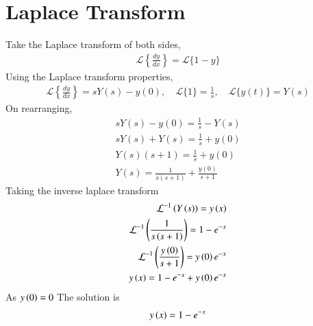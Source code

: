\documentclass[journal,12pt,onecolumn]{IEEEtran}
\theoremstyle{remark}
\begin{document}
\section{Laplace Transform}
Take the Laplace transform of both sides,\\
\begin{align}
    \mathcal{L}\left\{\frac{dy}{dx}\right\} = \mathcal{L}\{1 - y\}
\end{align}
Using the Laplace transform properties,\\
\begin{align}
    \mathcal{L}\left\{\frac{dy}{dx}\right\} = sY(s) - y(0), \quad \mathcal{L}\{1\} = \frac{1}{s}, \quad \mathcal{L}\{y(t)\} = Y(s)
\end{align}
On rearranging,\\
\begin{align}
    sY(s) - y(0) = \frac{1}{s} - Y(s)\\
    sY(s) + Y(s) = \frac{1}{s} + y(0)\\
    Y(s)(s + 1) = \frac{1}{s} + y(0)\\
    Y(s) = \frac{1}{s(s+1)} + \frac{y(0)}{s+1}
\end{align}
Taking the inverse laplace transform \\
\begin{align}
\mathcal{L}^{-1}\left(Y\left(s\right)\right)=y\left(x\right)\\
    \mathcal{L}^{-1}\left(\frac{1}{s\left(s+1\right)}\right)=1-e^{-x}\\
    \mathcal{L}^{-1}\left(\frac{y\left(0\right)}{s+1}\right)=y\left(0\right)e^{-x}\\
    y\left(x\right)=1-e^{-x}+y\left(0\right)e^{-x}
\end{align}
As $y\left(0\right)=0$
The solution is 
\begin{align}
    y\left(x\right)=1-e^{-x}
\end{align}
\end{document}
